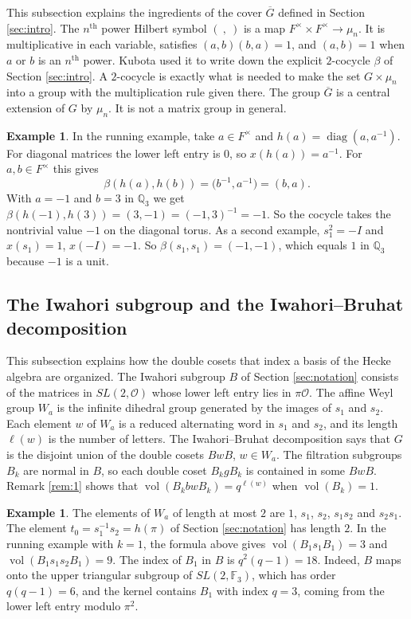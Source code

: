 \documentclass[12pt,letterpaper,reqno]{amsart}
\let\cal\mathcal
\theoremstyle{definition}
\newtheorem{example}[theorem]{Example}
\theoremstyle{remark}
\numberwithin{equation}{section}
\begin{document}
This subsection explains the ingredients of the cover $\overline{G}$ defined
in Section \ref{sec:intro}. The $n^{\text{th}}$ power Hilbert symbol
$(\ ,\ )$ is a map $F^\times\times F^\times\rightarrow\mu_n$. It is
multiplicative in each variable, satisfies $(a,b)(b,a)=1$, and $(a,b)=1$ when
$a$ or $b$ is an $n^{\text{th}}$ power. Kubota \cite{Ku67} used it to write
down the explicit $2$-cocycle $\beta$ of Section \ref{sec:intro}. A
$2$-cocycle is exactly what is needed to make the set $G\times\mu_n$ into a
group with the multiplication rule given there. The group $\overline{G}$ is a
central extension of $G$ by $\mu_n$. It is not a matrix group in general.

\begin{example}
\label{ex:bg-kubota}
In the running example, take $a\in F^\times$ and $h(a)=\operatorname{diag}(a,
a^{-1})$. For diagonal matrices the lower left entry is $0$, so
$x(h(a))=a^{-1}$. For $a,b\in F^\times$ this gives
\[
\beta(h(a),h(b))=\bigl(b^{-1},a^{-1}\bigr)=(b,a).
\]
With $a=-1$ and $b=3$ in $\mathbb{Q}_3$ we get $\beta(h(-1),h(3))=(3,-1)
=(-1,3)^{-1}=-1$. So the cocycle takes the nontrivial value $-1$ on the
diagonal torus. As a second example, $s_1^2=-I$ and $x(s_1)=1$, $x(-I)=-1$.
So $\beta(s_1,s_1)=(-1,-1)$, which equals $1$ in $\mathbb{Q}_3$ because $-1$ is
a unit.
\end{example}

\subsection{The Iwahori subgroup and the Iwahori--Bruhat decomposition}
\label{sec:bg-bruhat}

This subsection explains how the double cosets that index a basis of the Hecke
algebra are organized. The Iwahori subgroup $B$ of Section \ref{sec:notation}
consists of the matrices in $SL(2,{\cal O})$ whose lower left entry lies in
$\pi{\cal O}$. The affine Weyl group $W_a$ is the infinite dihedral group
generated by the images of $s_1$ and $s_2$. Each element $w$ of $W_a$ is a
reduced alternating word in $s_1$ and $s_2$, and its length $\ell(w)$ is the
number of letters. The Iwahori--Bruhat decomposition says that $G$ is the
disjoint union of the double cosets $BwB$, $w\in W_a$. The filtration
subgroups $B_k$ are normal in $B$, so each double coset $B_kgB_k$ is
contained in some $BwB$. Remark \ref{rem:1} shows that
$\operatorname{vol}(B_kbwB_k)=q^{\ell(w)}$ when $\operatorname{vol}(B_k)=1$.

\begin{example}
\label{ex:bg-bruhat}
The elements of $W_a$ of length at most $2$ are $1$, $s_1$, $s_2$, $s_1s_2$
and $s_2s_1$. The element $t_0=s_1^{-1}s_2=h(\pi)$ of Section
\ref{sec:notation} has length $2$. In the running example with $k=1$, the
formula above gives $\operatorname{vol}(B_1s_1B_1)=3$ and
$\operatorname{vol}(B_1s_1s_2B_1)=9$. The index of $B_1$ in $B$ is
$q^2(q-1)=18$. Indeed, $B$ maps onto the upper triangular subgroup of
$SL(2,\mathbb{F}_3)$, which has order $q(q-1)=6$, and the kernel contains
$B_1$ with index $q=3$, coming from the lower left entry modulo $\pi^2$.
\end{example}
\end{document}
